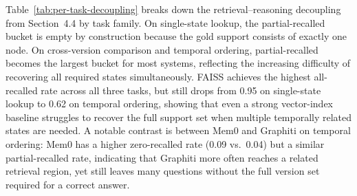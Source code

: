 Table~\ref{tab:per-task-decoupling} breaks down the retrieval--reasoning decoupling from Section~4.4 by task family. On single-state lookup, the partial-recalled bucket is empty by construction because the gold support consists of exactly one node. On cross-version comparison and temporal ordering, partial-recalled becomes the largest bucket for most systems, reflecting the increasing difficulty of recovering all required states simultaneously. FAISS achieves the highest all-recalled rate across all three tasks, but still drops from 0.95 on single-state lookup to 0.62 on temporal ordering, showing that even a strong vector-index baseline struggles to recover the full support set when multiple temporally related states are needed. A notable contrast is between Mem0 and Graphiti on temporal ordering: Mem0 has a higher zero-recalled rate (0.09 vs.\ 0.04) but a similar partial-recalled rate, indicating that Graphiti more often reaches a related retrieval region, yet still leaves many questions without the full version set required for a correct answer.
